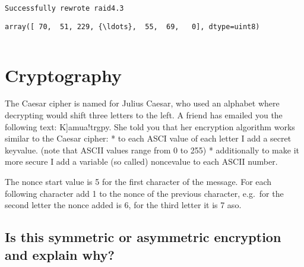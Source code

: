 \documentclass[11pt]{article}
\makeatletter
\newcommand{\boxspacing}{\kern\kvtcb@left@rule\kern\kvtcb@boxsep}
\newcommand{\prompt}[4]{
        {\ttfamily\llap{{\color{#2}[#3]:\hspace{3pt}#4}}\vspace{-\baselineskip}}
    }
\makeatother
\begin{document}
    \begin{Verbatim}[commandchars=\\\{\}]
Successfully rewrote raid4.3
    \end{Verbatim}

            \begin{tcolorbox}[breakable, size=fbox, boxrule=.5pt, pad at break*=1mm, opacityfill=0]
\prompt{Out}{outcolor}{10}{\boxspacing}
\begin{Verbatim}[commandchars=\\\{\}]
array([ 70,  51, 229, {\ldots},  55,  69,   0], dtype=uint8)
\end{Verbatim}
\end{tcolorbox}
        
    \begin{tcolorbox}[breakable, size=fbox, boxrule=1pt, pad at break*=1mm,colback=cellbackground, colframe=cellborder]
\prompt{In}{incolor}{ }{\boxspacing}
\begin{Verbatim}[commandchars=\\\{\}]

\end{Verbatim}
\end{tcolorbox}

    \hypertarget{cryptography}{%
\section{Cryptography}\label{cryptography}}

The Caesar cipher is named for Julius Caesar, who used an alphabet where
decrypting would shift three letters to the left. A friend has emailed
you the following text: K{]}amua!trgpy. She told you that her encryption
algorithm works similar to the Caesar cipher: * to each ASCI value of
each letter I add a secret keyvalue. (note that ASCII values range from
0 to 255) * additionally to make it more secure I add a variable (so
called) noncevalue to each ASCII number.

The nonce start value is 5 for the first character of the message. For
each following character add 1 to the nonce of the previous character,
e.g.~for the second letter the nonce added is 6, for the third letter it
is 7 aso.

    \hypertarget{is-this-symmetric-or-asymmetric-encryption-and-explain-why}{%
\subsection{Is this symmetric or asymmetric encryption and
explain
why?}\label{is-this-symmetric-or-asymmetric-encryption-and-explain-why}}
\end{document}
